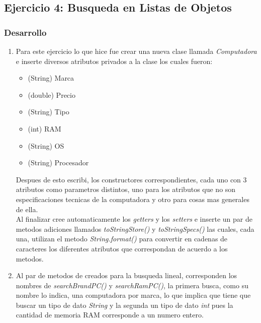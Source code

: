 \documentclass{article}
\begin{document}
			\newpage
			
		\subsection{Ejercicio 4: Busqueda en Listas de Objetos}
			
			\subsubsection{Desarrollo}
			
			\begin{enumerate}
				\item Para este ejercicio lo que hice fue crear una nueva clase llamada \emph{Computadora} e inserte diversos atributos privados a la clase los cuales fueron:
				
				\begin{itemize}
					\item (String) Marca
					\item (double) Precio
					\item (String) Tipo
					\item (int) RAM
					\item (String) OS
					\item (String) Procesador
				\end{itemize}
			
				Despues de esto escribi, los constructores correspondientes, cada uno con 3 atributos como parametros distintos, uno para los atributos que no son especificaciones tecnicas de la computadora y otro para cosas mas generales de ella. \\
				
				Al finalizar cree automaticamente los \textit{getters} y los \textit{setters} e inserte un par de metodos adiciones llamados \emph{toStringStore()} y \emph{toStringSpecs()} las cuales, cada una, utilizan el metodo \emph{String.format()} para convertir en cadenas de caracteres los diferentes atributos que correspondan de acuerdo a los metodos.\\ 
				
				\item Al par de metodos de creados para la busqueda lineal, corresponden los nombres de \emph{searchBrandPC()} y \emph{searchRamPC()}, la primera busca, como su nombre lo indica, una computadora por marca, lo que implica que tiene que buscar un tipo de dato \textit{String} y la segunda un tipo de dato \textit{int} pues la cantidad de memoria RAM corresponde a un numero entero.\\
				

\end{enumerate}
\end{document}
